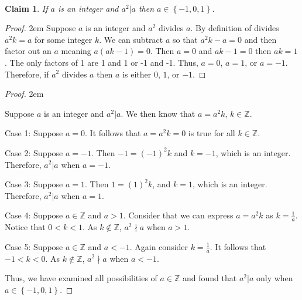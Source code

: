 \documentclass[12 pt]{article}
\newcommand{\Z}{\mathbb{Z}}
\newcommand{\set}[1]{\left\{#1\right\}}
\theoremstyle{definition}
\theoremstyle{plain}
\theoremstyle{mytheorem}
\newtheorem{claim}{Claim}
\theoremstyle{myexample}
\theoremstyle{mydefinition}
\begin{document}
\begin{center} \underline{\hspace{\textwidth}}\\ \underline{\hspace{\textwidth}} \end{center}


\begin{claim}  If $a$ is an integer and $a^2|a$ then $a \in \set{-1,0,1}$.
\end{claim}

\begin{proof}  \openup 2em {Suppose $a$ is an integer and $a^2$ divides $a$.  By definition of divides $a^2k=a$ for some integer $k$.  We can subtract $a$ so that $a^2k-a=0$ and then factor out an $a$ meaning $a(ak-1)=0$.  Then $a=0$ and $ak-1=0$ then $ak=1$.  The only factors of 1 are 1 and 1 or -1 and -1.  Thus, $a=0$, $a=1$, or $a=-1$.  Therefore, if $a^2$ divides $a$ then $a$ is either $0$, $1$, or $-1$.}
\end{proof}
\begin{center} \underline{\hspace{\textwidth}} \end{center}

\begin{proof}  \openup 2em {Suppose $a$ is an integer and $a^2|a$.  We then know that $a=a^2k$, $k \in \Z$.  
	\begin{description}
	\item{Case 1:}  Suppose $a=0$.  It follows that $a=a^2k=0$ is true for all $k \in \Z$.
	\item{Case 2:}  Suppose $a=-1$.  Then $-1=(-1)^2k$ and $k=-1$, which is an integer.  Therefore, $a^2|a$ when $a=-1$.
	\item{Case 3:}  Suppose $a=1$.  Then $1=(1)^2k$, and $k=1$, which is an integer.  Therefore, $a^2|a$ when $a=1$.
	\item{Case 4:}  Suppose $a \in \Z$ and $a>1$.  Consider that we can express $a =a^2k$ as $k= \frac{1}{a}$.  Notice that $0<k<1$.  As $k \notin \Z$, $a^2 \nmid a$ when $a>1$.
	\item{Case 5:}  Suppose $a \in \Z$ and $a<-1$.  Again consider $k = \frac{1}{a}$.  It follows that $-1<k<0$.  As $k \notin \Z$, $a^2 \nmid a$ when $a<-1$.
	\end{description}
	Thus, we have examined all possibilities of $a \in \Z$ and found that $a^2 | a$ only when $a \in \set{-1,0,1}$.}
\end{proof}
\end{document}
